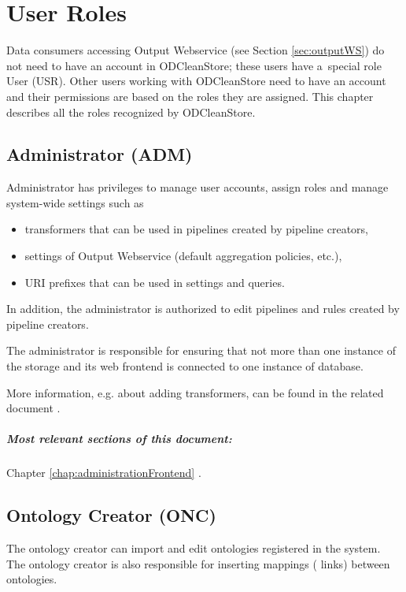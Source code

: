 
\chapter{User Roles}
\label{chap:userRoles}


Data consumers accessing Output Webservice (see Section \ref{sec:outputWS}) do not need to have an account in ODCleanStore; these users have a~special role User (USR). Other users working with ODCleanStore need to have an account and their permissions are based on the roles they are assigned. This chapter describes all the roles recognized by ODCleanStore.

\section[Administrator]{Administrator (ADM)}
\label{sec:adm}

	Administrator has privileges to manage user accounts, assign roles and manage system-wide settings such as
	\begin{itemize}
		\item transformers that can be used in pipelines created by pipeline creators,
		\item settings of Output Webservice (default aggregation policies, etc.),
		\item URI prefixes that can be used in settings and queries.
	\end{itemize}

	In addition, the administrator is authorized to edit pipelines and rules created by pipeline creators.

	The administrator is responsible for ensuring that not more than one instance of the storage and its web frontend is connected to one instance of database.

	More information, e.g. about adding transformers, can be found in the related document .

	\paragraph{Most relevant sections of this document:} Chapter \ref{chap:administrationFrontend} .

\section[Ontology Creator]{Ontology Creator (ONC)}
\label{sec:onc}
	The ontology creator can import and edit ontologies registered in the system. The ontology creator is also responsible for inserting mappings ( links) between ontologies.

